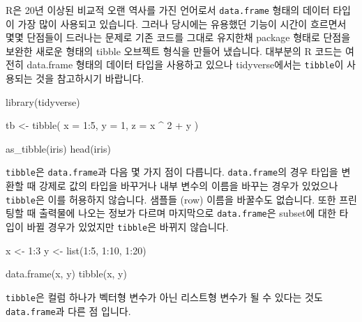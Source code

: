 \documentclass[
]{book}
\newenvironment{Shaded}{\begin{snugshade}}{\end{snugshade}}
\newcommand{\AttributeTok}[1]{\textcolor[rgb]{0.77,0.63,0.00}{#1}}
\newcommand{\DecValTok}[1]{\textcolor[rgb]{0.00,0.00,0.81}{#1}}
\newcommand{\FunctionTok}[1]{\textcolor[rgb]{0.00,0.00,0.00}{#1}}
\newcommand{\NormalTok}[1]{#1}
\newcommand{\OtherTok}[1]{\textcolor[rgb]{0.56,0.35,0.01}{#1}}
\newcommand{\SpecialCharTok}[1]{\textcolor[rgb]{0.00,0.00,0.00}{#1}}
\begin{document}
R은 20년 이상된 비교적 오랜 역사를 가진 언어로서 \texttt{data.frame} 형태의 데이터 타입이 가장 많이 사용되고 있습니다. 그러나 당시에는 유용했던 기능이 시간이 흐르면서 몇몇 단점들이 드러나는 문제로 기존 코드를 그대로 유지한채 package 형태로 단점을 보완한 새로운 형태의 tibble 오브젝트 형식을 만들어 냈습니다. 대부분의 R 코드는 여전히 data.frame 형태의 데이터 타입을 사용하고 있으나 tidyverse에서는 \texttt{tibble}이 사용되는 것을 참고하시기 바랍니다.

\begin{Shaded}
\begin{Highlighting}[]
\FunctionTok{library}\NormalTok{(tidyverse)}

\NormalTok{tb }\OtherTok{\textless{}{-}} \FunctionTok{tibble}\NormalTok{(}
  \AttributeTok{x =} \DecValTok{1}\SpecialCharTok{:}\DecValTok{5}\NormalTok{, }
  \AttributeTok{y =} \DecValTok{1}\NormalTok{, }
  \AttributeTok{z =}\NormalTok{ x }\SpecialCharTok{\^{}} \DecValTok{2} \SpecialCharTok{+}\NormalTok{ y}
\NormalTok{)}

\FunctionTok{as\_tibble}\NormalTok{(iris)}
\FunctionTok{head}\NormalTok{(iris)}
\end{Highlighting}
\end{Shaded}

\texttt{tibble}은 \texttt{data.frame}과 다음 몇 가지 점이 다릅니다. \texttt{data.frame}의 경우 타입을 변환할 때 강제로 값의 타입을 바꾸거나 내부 변수의 이름을 바꾸는 경우가 있었으나 \texttt{tibble}은 이를 허용하지 않습니다. 샘플들 (row) 이름을 바꿀수도 없습니다. 또한 프린팅할 때 출력물에 나오는 정보가 다르며 마지막으로 \texttt{data.frame}은 subset에 대한 타입이 바뀔 경우가 있었지만 \texttt{tibble}은 바뀌지 않습니다.

\begin{Shaded}
\begin{Highlighting}[]

\NormalTok{x }\OtherTok{\textless{}{-}} \DecValTok{1}\SpecialCharTok{:}\DecValTok{3}
\NormalTok{y }\OtherTok{\textless{}{-}} \FunctionTok{list}\NormalTok{(}\DecValTok{1}\SpecialCharTok{:}\DecValTok{5}\NormalTok{, }\DecValTok{1}\SpecialCharTok{:}\DecValTok{10}\NormalTok{, }\DecValTok{1}\SpecialCharTok{:}\DecValTok{20}\NormalTok{)}

\FunctionTok{data.frame}\NormalTok{(x, y)}
\FunctionTok{tibble}\NormalTok{(x, y)}
\end{Highlighting}
\end{Shaded}

\texttt{tibble}은 컬럼 하나가 벡터형 변수가 아닌 리스트형 변수가 될 수 있다는 것도 \texttt{data.frame}과 다른 점 입니다.
\end{document}
